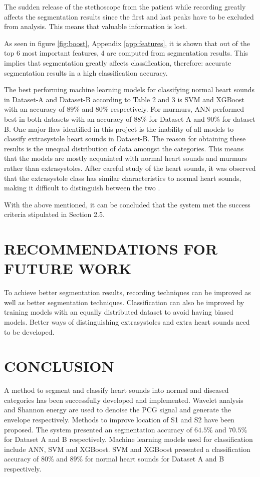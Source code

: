 \documentclass[10pt,twocolumn]{witseiepaper}
\begin{document}
The sudden release of the stethoscope from the patient while recording greatly affects the segmentation results since the first and last peaks have to be excluded from analysis. This means that valuable information is lost.

As seen in figure \ref{fig:boost}, Appendix \ref{app:features}, it is shown that out of the top 6 most important features, 4 are computed from segmentation results. This implies that segmentation greatly affects classification, therefore: accurate segmentation results in a high classification accuracy. 

The best performing machine learning models for classifying normal heart sounds in Dataset-A and Dataset-B according to Table 2 and 3 is SVM and XGBoost with an accuracy of $89\%$ and $80\%$ respectively. For murmurs, ANN performed best in both datasets with an accuracy of $88\%$ for Dataset-A and $90\%$ for dataset B. One major flaw identified in this project is the inability of all models to classify extrasystole heart sounds in Dataset-B. The reason for obtaining these results is the unequal distribution of data amongst the categories. This means that the models are mostly acquainted with normal heart sounds and murmurs rather than extrasystoles. After careful study of the heart sounds, it was observed that the extrasystole class has similar characteristics to normal heart sounds, making it difficult to distinguish between the two \cite{bentley2011pascal}.

With the above mentioned, it can be concluded that the system met the success criteria stipulated in Section 2.5.
%
\section{RECOMMENDATIONS FOR FUTURE WORK}
To achieve better segmentation results, recording techniques can be improved as well as better segmentation techniques. Classification can also be improved by training models with an equally distributed dataset to avoid having biased models. Better ways of distinguishing extrasystoles and extra heart sounds need to be developed.

\section{CONCLUSION}

A method to segment and classify heart sounds into normal and diseased categories has been successfully developed and implemented. Wavelet analysis and Shannon energy are used to denoise the PCG signal and generate the envelope respectively. Methods to improve location of S1 and S2 have been proposed. The system presented an segmentation accuracy of $64.5\%$ and $70.5\%$ for Dataset A and B respectively. Machine learning models used for classification include ANN, SVM and XGBoost. SVM and XGBoost presented a classification accuracy of $80\%$ and $89\%$ for normal heart sounds for Dataset A and B respectively. 
\end{document}

